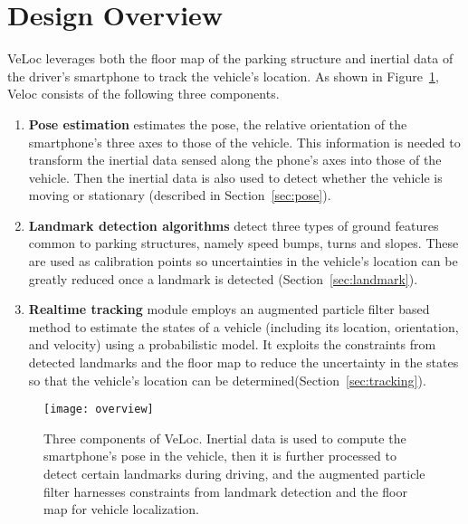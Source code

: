 \section{Design Overview}\label{sec:overview}

VeLoc leverages both the floor map of the parking structure and inertial data of the driver's smartphone to track the vehicle's location. As shown in Figure~\ref{pix:overview}, Veloc consists of the following three components.
\begin{enumerate}
  \item \textbf{Pose estimation} estimates the pose, the relative orientation of the smartphone's three axes to those of the vehicle. This information is needed to transform the inertial data sensed along the phone's axes into those of the vehicle. Then the inertial data is also used to detect whether the vehicle is moving or stationary (described in Section~\ref{sec:pose}).
  \item \textbf{Landmark detection algorithms} detect three types of ground features common to parking structures, namely speed bumps, turns and slopes. These are used as calibration points so uncertainties in the vehicle's location can be greatly reduced once a landmark is detected (Section~\ref{sec:landmark}).
  \item \textbf{Realtime tracking} module employs an augmented particle filter based method to estimate the states of a vehicle (including its location, orientation, and velocity) using a probabilistic model. It exploits the constraints from detected landmarks and the floor map to reduce the uncertainty in the states so that the vehicle's location can be determined(Section~\ref{sec:tracking}).
\end{enumerate}
\begin{figure}[h]
  \centering
  \texttt{[image: overview]}\\
  \caption{Three components of VeLoc. Inertial data is used to compute the smartphone's pose in the vehicle, then it is further processed to detect certain landmarks during driving, and the augmented particle filter harnesses constraints from landmark detection and the floor map for vehicle localization.}\label{pix:overview}
\end{figure}


